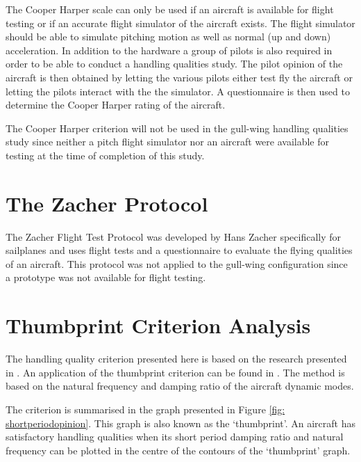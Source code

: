 \documentclass{report}
\begin{document}
The Cooper Harper scale can only be used if an aircraft is available for flight testing or if an accurate flight simulator of the aircraft exists.  The flight simulator should be able to simulate pitching motion as well as normal (up and down) acceleration.  In addition to the hardware a group of pilots is also required in order to be able to conduct a handling qualities  study.  The pilot opinion of the aircraft is then obtained by letting the various pilots either test fly the aircraft or letting the pilots interact with the the simulator.  A questionnaire is then used to determine the Cooper Harper rating of the aircraft.

The Cooper Harper criterion will not be used in the gull-wing handling qualities study since neither a pitch flight simulator nor an aircraft were available for testing at the time of completion of this study.

\section{The Zacher Protocol}


The Zacher Flight Test Protocol \citep{SailPlaneDesign} was developed by Hans Zacher specifically for sailplanes and uses flight tests and a questionnaire to evaluate the flying qualities of an aircraft.  This protocol was not applied to the gull-wing configuration since a prototype was not available for flight testing.

\section{Thumbprint Criterion Analysis}\label{sec: perfcriteria}


The handling quality criterion presented here is based on the research presented in \cite{OHara}.  An application of the thumbprint criterion can be found in .
The method is based on the natural frequency and damping ratio of the aircraft dynamic modes.  

The criterion is summarised in the graph presented in Figure \ref{fig: shortperiodopinion}.  This graph is also known as the `thumbprint'.  An aircraft has satisfactory handling qualities when its short period damping ratio and natural frequency can be plotted in the centre of the contours of the `thumbprint' graph.  
\end{document}
